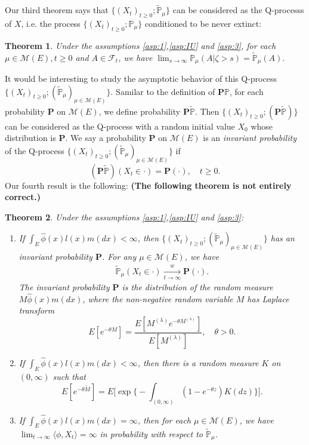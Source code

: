 \documentclass[12pt,a4paper]{amsart}
\numberwithin{equation}{section}
\theoremstyle{plain}
\newtheorem{thm}{Theorem}[section]
\theoremstyle{definition}
\begin{document}
Our third theorem says that $\{(X_t)_{t\geq 0}; \widetilde{\mathbb P}_{\mu}\}$ can be considered as the Q-processs of $X$, i.e. the process $\{(X_t)_{t\geq 0}; \mathbb P_{\mu}\}$ conditioned to be never extinct:
\begin{thm}\label{thm:Q_process}
	Under the assumptions \ref{asp:1},\ref{asp:IU} and \ref{asp:3}, for each  $\mu \in \mathcal M(E), t\geq 0$ and $A\in\mathscr F_t$, we have $\lim_{s\rightarrow\infty}\mathbb P_\mu(A |\zeta>s)=\widetilde{\mathbb P}_\mu(A). $
\end{thm}

It would be interesting to study the asymptotic behavior of this Q-process $\{(X_t)_{t\geq 0}; (\widetilde{\mathbb P}_\mu)_{\mu \in \mathcal M(E)}\}$.
Samilar to the definition of $\mathbf P\mathbb P$, for each probability $\mathbf
P$ on $\mathcal M(E)$, we define probability $\mathbf P\widetilde{\mathbb P}$.
Then $\{(X_t)_{t\geq 0}; (\mathbf P\widetilde{\mathbb P})\}$ can be considered as the Q-process with a random initial value $X_0$ whose distribution is $\mathbf P$.
We say a probability $\mathbf P$ on $\mathcal M(E)$ is an \emph{invariant probability} of the Q-process $\{(X_t)_{t\geq 0}; (\widetilde{\mathbb P}_\mu)_{\mu\in\mathcal M(E)}\}$ if
\[
	(\mathbf P\widetilde{\mathbb P})(X_t \in \cdot ) =\mathbf P(\cdot),	\quad t\geq 0.
\]
Our fourth result is the following:
{\bf (The following theorem is not entirely correct.)}
\begin{thm}\label{thm:structure_of_Qprocess}
	Under the assumptions \ref{asp:1},\ref{asp:IU} and \ref{asp:3}:
  \begin{enumerate}
  \item
    If $\int_E\widehat\phi(x)l(x)m(dx)<\infty$, then $\{(X_t)_{t\geq 0};(\widetilde{\mathbb P}_\mu)_{\mu\in\mathcal M(E)}\}$ has an invariant probability ${\mathbf P}$.
    For any $\mu\in\mathcal M(E)$, we have
\begin{align}
\label{eq:uniqueness_of_invariant_probability}
\widetilde{\mathbb P}_\mu(X_t \in \cdot ) \xrightarrow[t\to \infty]{w} {\mathbf P}(\cdot).
\end{align}
    The invariant probability $\mathbf P$ is the distribution of the random measure $M\widehat\phi(x)m(dx)$, where the non-negative random variable $M$ has Laplace transform
    \[
      E[e^{-\theta  M}] = \dfrac{E[M^{(\lambda)}e^{-\theta M^{(\lambda)}}]}{E[M^{(\lambda)}]},\quad \theta > 0.
    \]
  \item
    If $\int_E\widehat\phi(x)l(x)m(dx)<\infty$, then there is a random measure $K$ on $(0,\infty)$ such that
    \[
      E[e^{-\theta \widetilde M}] = E\Big[\exp\Big\{- \int_{(0,\infty)} (1-e^{-\theta z }) K(dz) \Big\}\Big].
    \]
  \item
    If $\int_E\widehat\phi(x)l(x)m(dx)=\infty$, then for each $\mu \in \mathcal M(E)$, we have $\lim_{t\rightarrow\infty}\langle \phi, X_t\rangle =\infty$ in probability with respect to $\widetilde{\mathbb P}_\mu$.
  \end{enumerate}
\end{thm}
\end{document}
